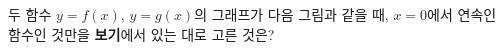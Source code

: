 두 함수 $y=f(x)$, $y=g(x)$의 그래프가 다음 그림과 같을 때, $x=0$에서 연속인 함수인 것만을 \textbf{보기}에서 있는 대로 고른 것은?
\par\smallskip\begin{center}\resizebox{\ifdim\width>\linewidth\linewidth\else\width\fi}{!}{}\end{center}
\noindent {}
